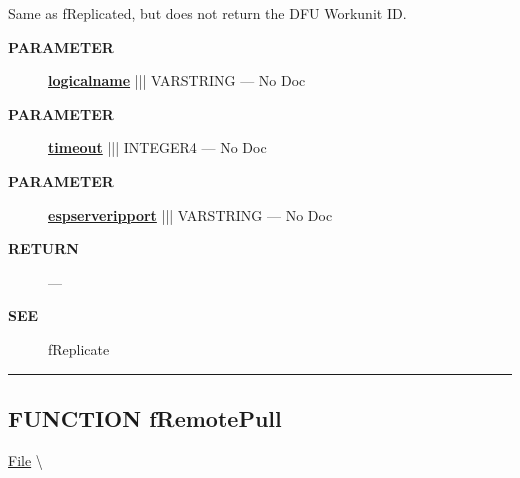 \par





Same as fReplicated, but does not return the DFU Workunit ID.






\par
\begin{description}
\item [\colorbox{tagtype}{\color{white} \textbf{\textsf{PARAMETER}}}] \textbf{\underline{logicalname}} ||| VARSTRING --- No Doc
\item [\colorbox{tagtype}{\color{white} \textbf{\textsf{PARAMETER}}}] \textbf{\underline{timeout}} ||| INTEGER4 --- No Doc
\item [\colorbox{tagtype}{\color{white} \textbf{\textsf{PARAMETER}}}] \textbf{\underline{espserveripport}} ||| VARSTRING --- No Doc
\end{description}







\par
\begin{description}
\item [\colorbox{tagtype}{\color{white} \textbf{\textsf{RETURN}}}] \textbf{} --- 
\end{description}







\par
\begin{description}
\item [\colorbox{tagtype}{\color{white} \textbf{\textsf{SEE}}}] fReplicate
\end{description}



\rule{\linewidth}{0.5pt}
\subsection*{\textsf{\colorbox{headtoc}{\color{white} FUNCTION}
fRemotePull}}

\hypertarget{ecldoc:file.fremotepull}{}
\hspace{0pt} \hyperlink{ecldoc:File}{File} \textbackslash 

